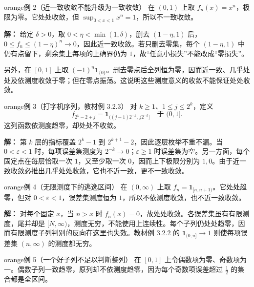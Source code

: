 \documentclass[11pt,a4paper]{article}
\begin{document}
\begin{sboxenv}{orange}{例 2（近一致收敛不能升级为一致收敛）}
在 \((0,1)\) 上取 \(f_n(x)=x^n\)，极限为零。它处处收敛，但
\(\sup_{0<x<1}x^n=1\)，所以不一致收敛。

\end{sboxenv}

\textbf{解：} 给定 \(\delta>0\)，取 \(0<\eta<\min(1,\delta)\)，删去
\((1-\eta,1)\)
后，\(0\le f_n\le(1-\eta)^n\to0\)，因此近一致收敛。若只删去零集，每个
\((1-\eta,1)\) 中仍有点留下，剩余集上每项的上确界仍为
\(1\)，故``任意小损失''不能改成``零损失''。

另外，在 \([0,1]\) 上取
\((-1)^n\mathbf1_{\{0\}}\)。删去零点后全列恒为零，因而近一致、几乎处处及依测度收敛于零；但在零点振荡。这说明这些测度意义的收敛不能保证处处收敛。

\begin{sboxenv}{orange}{例 3（打字机序列，教材例 3.2.3）}
对 \(k\ge1\)、\(1\le j\le2^k\)，定义
\begin{equation*}f_{2^k-2+j}=\mathbf1_{((j-1)2^{-k},\,j2^{-k}]}\quad\text{于 }(0,1].\end{equation*}
这列函数依测度趋零，却处处不收敛。

\end{sboxenv}

\textbf{解：} 第 \(k\) 层的指标覆盖 \(2^k-1\) 到
\(2^{k+1}-2\)，因此逐层枚举不重不漏。当 \(0<\varepsilon<1\)
时，每项误差集测度为 \(2^{-k}\to0\)；\(\varepsilon\ge1\)
时误差集为空。另一方面，每个固定点在每层恰取一次 \(1\)，又至少取一次
\(0\)，因而上下极限分别为
\(1,0\)。由于近一致收敛必推出几乎处处收敛，它也不近一致，更不一致收敛。

\begin{sboxenv}{orange}{例 4（无限测度下的逃逸区间）}
在 \((0,\infty)\) 上取 \(f_n=\mathbf1_{[n,n+1)}\)。它处处趋零，但对
\(0<\varepsilon<1\)，误差集测度恒为
\(1\)，所以不依测度收敛，也不近一致收敛。

\end{sboxenv}

\textbf{解：} 对每个固定 \(x\)，当 \(n>x\) 时
\(f_n(x)=0\)，故处处收敛。各误差集虽有有限测度，尾并却是
\([N,\infty)\)，测度无穷，不能使用上连续性。每个子列仍处处趋零，因而有限测度子列判别的反向在这里也失效。教材例
3.2.2 的 \(\mathbf1_{(0,n]}\to1\) 则使每项误差集 \((n,\infty)\)
的测度都无穷。

\begin{sboxenv}{orange}{例 5（一个好子列不足以判断整列）}
在 \([0,1]\)
上令偶数项为零、奇数项为一。偶数子列一致趋零，原列却不依测度趋零，因为每个奇数项误差超过
\(\frac12\) 的集合都是全区间。

\end{sboxenv}
\end{document}
